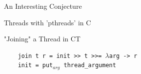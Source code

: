 \documentclass{beamer}
\newcommand{\forget}[1]{}
\begin{document}
\begin{frame}{An Interesting Conjecture}
\begin{structure}{Threads with 'pthreads' in C}
\begin{onlinebox}{10cm}
\end{onlinebox}
\end{structure}

\medskip

\begin{structure}{"Joining" a Thread in CT}

\begin{onlinebox}{9cm}

\begin{flushleft}

\texttt{\ \ \ \ join t r = init >> t >>= $\lambda$arg -> r}\\
\texttt{\ \ \ \ init = put$_{arg}$ thread\_argument}\\

\end{flushleft}
\end{onlinebox}

\end{structure}

\forget{

\begin{itemize}

\item{A thread is a "lightweight process" without its own address space}

\item{A process, by definition, runs in the midst of some enveloping execution stream}

\item{That means, given some other execution stream $r$, $t$ denotes the execution of thread $t$ relative to $r$}

\item{In particular, both $sched$ and $handler$ are proper threads according to this definition}

\item{Compare with usages of the pthreads library in C, esp. the use of 'pthread\_join'}

\item{\emph{Can we characterize the notion of threads in terms of this type?}}


\end{itemize}
} %



\end{frame}
\end{document}
